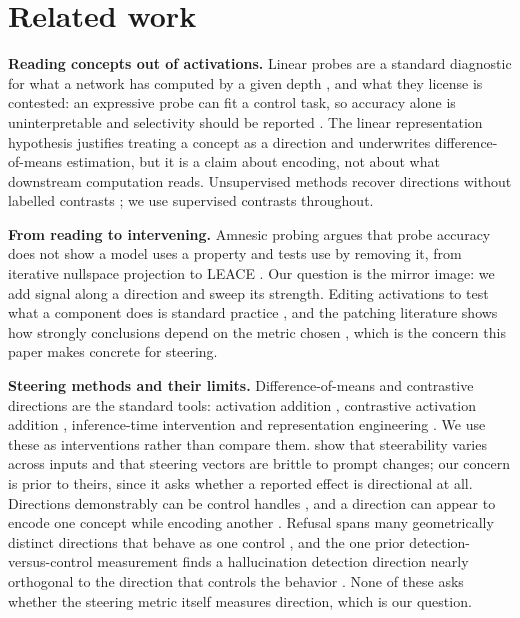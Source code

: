 \documentclass{article}
\begin{document}
\section{Related work}
\label{sec:related}

\textbf{Reading concepts out of activations.} Linear probes are a standard
diagnostic for what a network has computed by a given depth
\citep{alain2016probes}, and what they license is contested: an expressive probe
can fit a control task, so accuracy alone is uninterpretable and selectivity
should be reported \citep{hewitt2019control, belinkov2022probing}. The linear
representation hypothesis \citep{park2024linear} justifies treating a concept as
a direction and underwrites difference-of-means estimation, but it is a claim
about encoding, not about what downstream computation reads. Unsupervised
methods recover directions without labelled contrasts
\citep{burns2023ccs, cunningham2024sae}; we use supervised contrasts throughout.

\textbf{From reading to intervening.} Amnesic probing \citep{elazar2021amnesic}
argues that probe accuracy does not show a model uses a property and tests use
by removing it, from iterative nullspace projection \citep{ravfogel2020inlp} to
LEACE \citep{belrose2023leace}. Our question is the mirror image: we add signal
along a direction and sweep its strength. Editing activations to test what a
component does is standard practice \citep{meng2022rome}, and the patching
literature shows how strongly conclusions depend on the metric chosen
\citep{zhang2023patching}, which is the concern this paper makes concrete for
steering.

\textbf{Steering methods and their limits.} Difference-of-means and contrastive
directions are the standard tools: activation addition
\citep{turner2023actadd}, contrastive activation addition
\citep{panickssery2023caa}, inference-time intervention \citep{li2023iti} and
representation engineering \citep{zou2023repe}. We use these as interventions
rather than compare them. \citet{tan2024steering} show that steerability varies
across inputs and that steering vectors are brittle to prompt changes; our
concern is prior to theirs, since it asks whether a reported effect is
directional at all. Directions demonstrably can be control handles
\citep{marks2023truth, todd2024function, arditi2024refusal}, and a direction can
appear to encode one concept while encoding another
\citep{bolukbasi2021illusion}. Refusal spans many geometrically distinct
directions that behave as one control \citep{joad2026refusal}, and the one prior
detection-versus-control measurement finds a hallucination detection direction
nearly orthogonal to the direction that controls the behavior
\citep{galeone2026perfect}. None of these asks whether the steering metric
itself measures direction, which is our question.
\end{document}
